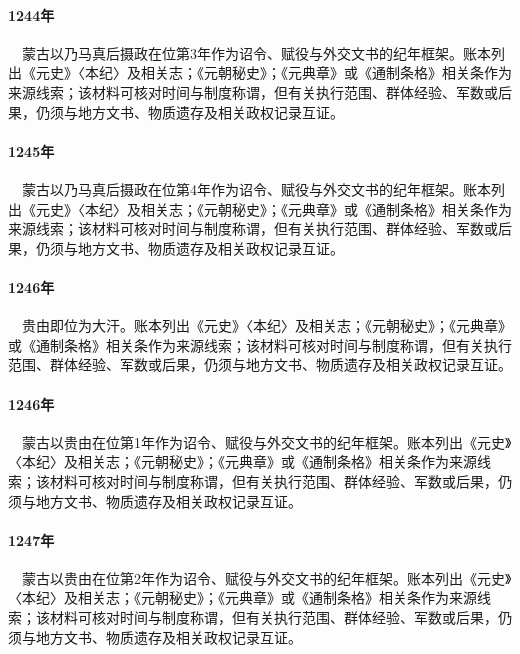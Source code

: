 \paragraph{1244年}　蒙古以乃马真后摄政在位第3年作为诏令、赋役与外交文书的纪年框架。账本列出《元史》〈本纪〉及相关志；《元朝秘史》；《元典章》或《通制条格》相关条作为来源线索；该材料可核对时间与制度称谓，但有关执行范围、群体经验、军数或后果，仍须与地方文书、物质遗存及相关政权记录互证。

\paragraph{1245年}　蒙古以乃马真后摄政在位第4年作为诏令、赋役与外交文书的纪年框架。账本列出《元史》〈本纪〉及相关志；《元朝秘史》；《元典章》或《通制条格》相关条作为来源线索；该材料可核对时间与制度称谓，但有关执行范围、群体经验、军数或后果，仍须与地方文书、物质遗存及相关政权记录互证。

\paragraph{1246年}　贵由即位为大汗。账本列出《元史》〈本纪〉及相关志；《元朝秘史》；《元典章》或《通制条格》相关条作为来源线索；该材料可核对时间与制度称谓，但有关执行范围、群体经验、军数或后果，仍须与地方文书、物质遗存及相关政权记录互证。

\paragraph{1246年}　蒙古以贵由在位第1年作为诏令、赋役与外交文书的纪年框架。账本列出《元史》〈本纪〉及相关志；《元朝秘史》；《元典章》或《通制条格》相关条作为来源线索；该材料可核对时间与制度称谓，但有关执行范围、群体经验、军数或后果，仍须与地方文书、物质遗存及相关政权记录互证。

\paragraph{1247年}　蒙古以贵由在位第2年作为诏令、赋役与外交文书的纪年框架。账本列出《元史》〈本纪〉及相关志；《元朝秘史》；《元典章》或《通制条格》相关条作为来源线索；该材料可核对时间与制度称谓，但有关执行范围、群体经验、军数或后果，仍须与地方文书、物质遗存及相关政权记录互证。

